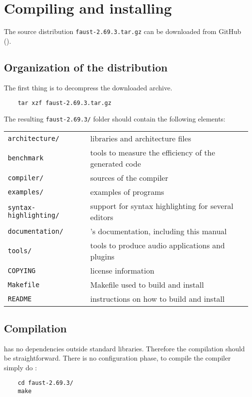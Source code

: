 \chapter{Compiling and installing \faust}
\label{install}


The \faust source distribution \lstinline'faust-2.69.3.tar.gz' can be downloaded from GitHub ().

\section{Organization of the distribution}
The first thing is to decompress the downloaded archive. 
\begin{lstlisting}
	tar xzf faust-2.69.3.tar.gz
\end{lstlisting}

The resulting \lstinline'faust-2.69.3/' folder should contain the following elements:

\begin{tabular}{ll}
	\lstinline'architecture/' 		&\faust libraries and architecture files\\
	\lstinline'benchmark'			&tools to measure the efficiency of the generated code\\
	\lstinline'compiler/'			&sources of the \faust compiler\\
	\lstinline'examples/'			&examples of \faust programs\\
	\lstinline'syntax-highlighting/'&	support for syntax highlighting for several editors\\
	\lstinline'documentation/' 		&\faust's documentation, including this manual\\
	\lstinline'tools/'				&tools to produce audio applications and plugins\\
	\lstinline'COPYING'			&license information\\
	\lstinline'Makefile'			&Makefile used to build and install \faust\\
	\lstinline'README'			&instructions on how to build and install \faust
\end{tabular}

\section{Compilation}
\faust has no dependencies outside standard libraries. Therefore the compilation should be straightforward. There is no configuration phase, to compile the \faust compiler simply do :
\begin{lstlisting}
	cd faust-2.69.3/
	make
\end{lstlisting}

